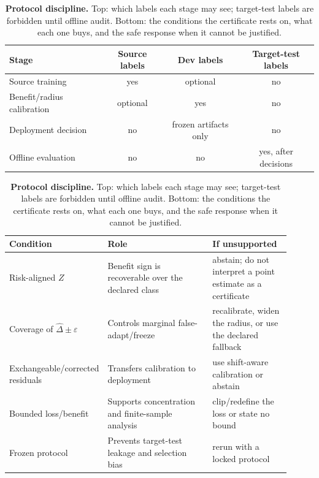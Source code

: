 \begin{table}[t]\centering\footnotesize
\caption{\textbf{Protocol discipline.} Top: which labels each stage may see; target-test labels
are forbidden until offline audit. Bottom: the conditions the certificate rests on, what each
one buys, and the safe response when it cannot be justified.}
\label{tab:data-access}\label{tab:assumptions-role}
\begin{tabular}{@{}lccc@{}}
\toprule
Stage & Source labels & Dev labels & Target-test labels \\
\midrule
Source training & yes & optional & no \\
Benefit/radius calibration & optional & yes & no \\
Deployment decision & no & frozen artifacts only & no \\
Offline evaluation & no & no & yes, after decisions \\
\bottomrule
\end{tabular}

\vspace{6pt}
\scriptsize
\begin{tabular}{@{}p{0.25\linewidth}p{0.38\linewidth}p{0.28\linewidth}@{}}
\toprule
Condition & Role & If unsupported \\
\midrule
Risk-aligned $Z$ & Benefit sign is recoverable over the declared class & abstain; do not interpret a point estimate as a certificate \\
Coverage of $\widehat\Delta\pm\varepsilon$ & Controls marginal false-adapt/freeze & recalibrate, widen the radius, or use the declared fallback \\
Exchangeable/\allowbreak corrected residuals & Transfers calibration to deployment & use shift-aware calibration or abstain \\
Bounded loss/benefit & Supports concentration and finite-sample analysis & clip/redefine the loss or state no bound \\
Frozen protocol & Prevents target-test leakage and selection bias & rerun with a locked protocol \\
\bottomrule
\end{tabular}
\end{table}

